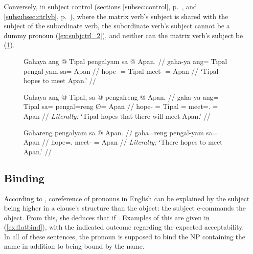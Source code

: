 Conversely, in subject control (sections \ref{subsec:control},
p.~\pageref{subsec:control}, and \ref{subsubsec:ctrlvb},
p.~\pageref{subsubsec:ctrlvb}), where the matrix verb's subject is shared with
the subject of the subordinate verb, the subordinate verb's subject cannot be a
dummy pronoun (\ref{ex:subjctrl_2}), and neither can the matrix verb's subject
be (\ref{ex:subjctrl_3}).

\begin{figure}
\pex\label{ex:subjctrl}
\a\label{ex:subjctrl_1}\begingl
	\gla Gahaya ang @ Tipal pengalyam sa @ Apan. //
	\glb gaha-ya ang= Tipal pengal-yam sa= Apan //
	\glc hope-\TsgM{} \Aarg{}= Tipal meet-\Ptcp{} \Parg{}= Apan //
	\glft `Tipal hopes to meet Apan.' //
\endgl

\a\label{ex:subjctrl_2}\ljudge*\begingl
	\gla Gahaya ang @ Tipal, sa @ pengalreng {} @ Apan. //
	\glb gaha-ya ang= Tipal sa= pengal=reng Ø= Apan //
	\glc hope-\TsgM{} \Aarg{}= Tipal \PatT{}= meet=\TsgI{}.\Aarg{} \Top{}=
		Apan //
	\glft \textit{Literally:} `Tipal hopes that there will meet Apan.' //
\endgl

\a\label{ex:subjctrl_3}\ljudge*\begingl
	\gla Gahareng pengalyam sa @ Apan. //
	\glb gaha=reng pengal-yam sa= Apan //
	\glc hope=\TsgI{}.\Aarg{} meet-\Ptcp{} \Parg{}= Apan //
	\glft \textit{Literally:} `There hopes to meet Apan.' //
\endgl
\xe
\end{figure}

\subsection{Binding}

According to \citet{speas1990}, coreference of pronouns in English can be
explained by the subject being higher in a clause's structure than the object:
the subject c-commands the object. From this, she deduces that if
. Examples of this are given in (\ref{ex:flatbind}),
with the indicated outcome regarding the expected acceptability. In all of
these sentences, the pronoun is supposed to bind the NP containing the name in
addition to being bound by the name.

\begin{figure}[h]
\pex\label{ex:flatbind}
	\a\label{ex:flatbind_1} 
	\a\label{ex:flatbind_2} \ljudge* {}
	\a\label{ex:flatbind_3} 
	\a\label{ex:flatbind_4} \ljudge* {}
\xe
\end{figure}

